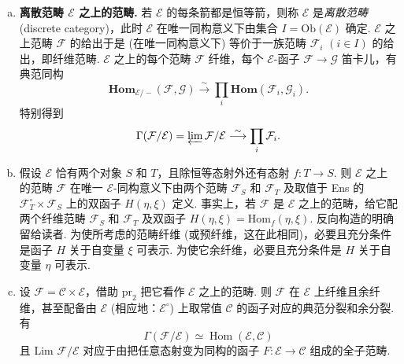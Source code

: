 \begin{enumerate}[a)]
有趣的情形是
\[
\mathcal{F}_b = \mathcal{F}_a^{\circ}, \quad G = F^{\circ}, \quad v = u^{\circ}.
\]
称范畴 $\mathcal{C}$ 中的\emph{自对偶} (self-duality) 为函子 $D \colon \mathcal{C} \to \mathcal{C}^{\circ}$ 和同构 $u \colon DD^{\circ} \xrightarrow{\sim} \mathrm{id}_{\mathcal{C}}$ 的给出，使 $u$ 与同构 $u^{\circ} \colon D^{\circ}D \stackrel{\sim}{\longrightarrow} \mathrm{id}_{\mathcal{C}^{\circ}}$ 使 $(D, D^{\circ})$ 成为一对伴随函子 (必然互为拟逆). 该条件写成：
\[
D(u(x)) = u(D(x)) \quad \text{对每个 } x \in \mathrm{Ob}(\mathcal{C}).
\]
\item \textbf{离散范畴 $\mathcal{E}$ 之上的范畴.} 若 $\mathcal{E}$ 的每条箭都是恒等箭，则称 $\mathcal{E}$ 是\emph{离散范畴} (discrete category)，此时 $\mathcal{E}$ 在唯一同构意义下由集合 $I = \mathrm{Ob}(\mathcal{E})$ 确定. $\mathcal{E}$ 之上范畴 $\mathcal{F}$ 的给出于是 (在唯一同构意义下) 等价于一族范畴 $\mathcal{F}_i$ $(i \in I)$ 的给出，即纤维范畴. $\mathcal{E}$ 之上的每个范畴 $\mathcal{F}$ 纤维，每个 $\mathcal{E}$-函子 $\mathcal{F} \to \mathcal{G}$ 笛卡儿，有典范同构
\[
\mathbf{Hom}_{\mathcal{E}/-}(\mathcal{F}, \mathcal{G}) \stackrel{\sim}{\longrightarrow} \prod_{i} \mathbf{Hom}(\mathcal{F}_i, \mathcal{G}_i).
\]
特别得到
\[
\Gamma(\mathcal{F}/\mathcal{E}) = \varprojlim \mathcal{F}/\mathcal{E} \stackrel{\sim}{\longrightarrow} \prod_{i} \mathcal{F}_i.
\]
\item 假设 $\mathcal{E}$ 恰有两个对象 $S$ 和 $T$，且除恒等态射外还有态射 $f \colon T \to S$. 则 $\mathcal{E}$ 之上的范畴 $\mathcal{F}$ 在唯一 $\mathcal{E}$-同构意义下由两个范畴 $\mathcal{F}_S$ 和 $\mathcal{F}_T$ 及取值于 Ens 的 $\mathcal{F}_T^{\circ} \times \mathcal{F}_S$ 上的双函子 $H(\eta, \xi)$ 定义. 事实上，若 $\mathcal{F}$ 是 $\mathcal{E}$ 之上的范畴，给它配两个纤维范畴 $\mathcal{F}_S$ 和 $\mathcal{F}_T$ 及双函子 $H(\eta, \xi) = \mathrm{Hom}_f(\eta, \xi)$. 反向构造的明确留给读者. 为使所考虑的范畴纤维 (或预纤维，这在此相同)，必要且充分条件是函子 $H$ 关于自变量 $\xi$ 可表示. 为使它余纤维，必要且充分条件是 $H$ 关于自变量 $\eta$ 可表示.
\item 设 $\mathcal{F} = \mathcal{C} \times \mathcal{E}$，借助 $\mathrm{pr}_2$ 把它看作 $\mathcal{E}$ 之上的范畴. 则 $\mathcal{F}$ 在 $\mathcal{E}$ 上纤维且余纤维，甚至配备由 $\mathcal{E}$ (相应地：$\mathcal{E}^{\circ}$) 上取常值 $\mathcal{C}$ 的函子对应的典范分裂和余分裂. 有
\[
\Gamma(\mathcal{F}/\mathcal{E}) \simeq \operatorname{Hom}(\mathcal{E}, \mathcal{C})
\]
且 Lim $\mathcal{F}/\mathcal{E}$ 对应于由把任意态射变为同构的函子 $F \colon \mathcal{E} \to \mathcal{C}$ 组成的全子范畴.
\end{enumerate}

